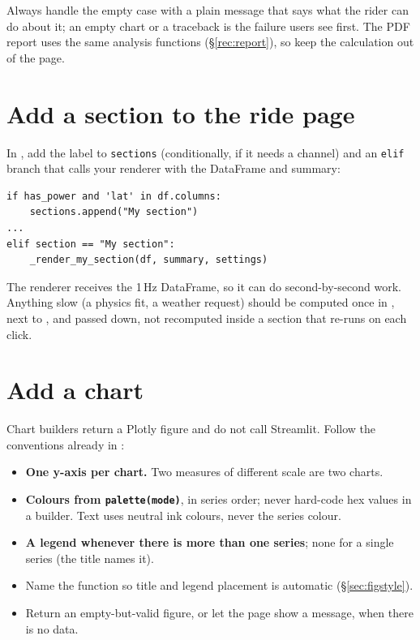 Always handle the empty case with a plain message that says what the rider can do about it; an empty chart or a
traceback is the failure users see first. The PDF report uses the same analysis functions
(\S\ref{rec:report}), so keep the calculation out of the page.

\section{Add a section to the ride page}\label{rec:ridesection}

In , add the label to \texttt{sections} (conditionally, if it needs a channel)
and an \texttt{elif} branch that calls your renderer with the DataFrame and summary:

\begin{lstlisting}
if has_power and 'lat' in df.columns:
    sections.append("My section")
...
elif section == "My section":
    _render_my_section(df, summary, settings)
\end{lstlisting}

The renderer receives the 1\,Hz DataFrame, so it can do second-by-second work. Anything slow (a physics fit, a
weather request) should be computed once in , next to
, and passed down, not recomputed inside a section that re-runs on each click.

\section{Add a chart}\label{rec:plot}

Chart builders return a Plotly figure and do not call Streamlit. Follow the conventions already in
:

\begin{itemize}
\item \textbf{One y-axis per chart.} Two measures of different scale are two charts.
\item \textbf{Colours from \texttt{palette(mode)}}, in series order; never hard-code hex values in a builder. Text uses
  neutral ink colours, never the series colour.
\item \textbf{A legend whenever there is more than one series}; none for a single series (the title names it).
\item Name the function  so title and legend placement is automatic (\S\ref{sec:figstyle}).
\item Return an empty-but-valid figure, or let the page show a message, when there is no data.
\end{itemize}

